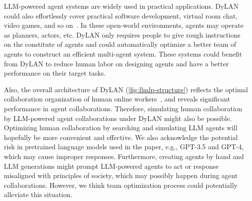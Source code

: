 \documentclass{article} %
\begin{document}
LLM-powered agent systems are widely used in practical applications. DyLAN could also effortlessly cover practical software development, virtual room chat, video games, and so on~\citep{meta-gpt,gpt-iot,llm-dba,minecraft-agent,chateval}. 
In these open-world environments, agents may operate as planners, actors, etc. 
DyLAN only requires people to give rough instructions on the constitute of agents and could automatically optimize a better team of agents to construct an efficient multi-agent system.
These systems could benefit from DyLAN to reduce human labor on designing agents and have a better performance on their target tasks.

Also, the overall architecture of DyLAN (\cref{fig:llmlp-structure}) reflects the optimal collaboration organization of human online workers~\citep{human-team-optimization}, and reveals significant performance in agent collaborations. Therefore, simulating human collaboration by LLM-powered agent collaborations under DyLAN might also be possible. Optimizing human collaboration by searching and simulating LLM agents will hopefully be more convenient and effective. We also acknowledge the potential risk in pretrained language models used in the paper, e.g., GPT-3.5 and GPT-4, which may cause improper responses. Furthermore, creating agents by hand and LLM generations might prompt LLM-powered agents to act or response misaligned with principles of society, which may possibly happen during agent collaborations. However, we think team optimization process could potentially alleviate this situation.



\end{document}
